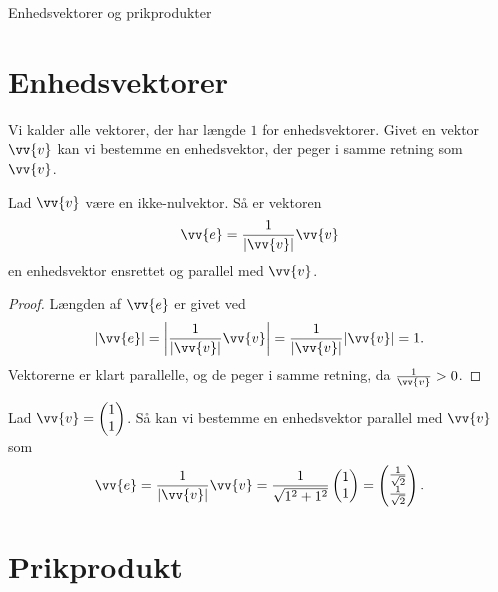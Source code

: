 \begin{center}
\Huge
Enhedsvektorer og prikprodukter
\end{center}

\section*{Enhedsvektorer}
 
Vi kalder alle vektorer, der har længde $1$ for enhedsvektorer. Givet en vektor $\vv{v}$ kan vi bestemme en enhedsvektor, der peger i samme retning som $\vv{v}$.
\begin{setn}
Lad $\vv{v}$ være en ikke-nulvektor. Så er vektoren
\begin{align*}
\vv{e} = \frac{1}{|\vv{v}|}\vv{v}
\end{align*}
en enhedsvektor ensrettet og parallel med $\vv{v}$.
\end{setn}
\begin{proof}
Længden af $\vv{e}$ er givet ved
\begin{align*}
|\vv{e}| = \left|\frac{1}{|\vv{v}|}\vv{v}\right| = \frac{1}{|\vv{v}|}|\vv{v}| = 1.
\end{align*}
Vektorerne er klart parallelle, og de peger i samme retning, da $\frac{1}{\vv{v}}>0$. 
\end{proof}

\begin{exa}
Lad $\vv{v} = \begin{pmatrix}
1\\ 1
\end{pmatrix}$. Så kan vi bestemme en enhedsvektor parallel med $\vv{v}$ som
\begin{align*}
\vv{e} = \frac{1}{|\vv{v}|}\vv{v} = \frac{1}{\sqrt{1^2+1^2}}\begin{pmatrix}
1\\ 1
\end{pmatrix} = \begin{pmatrix}
\frac{1}{\sqrt{2}}\\ \frac{1}{\sqrt{2}}
\end{pmatrix}.
\end{align*}
\end{exa}

\section*{Prikprodukt}

